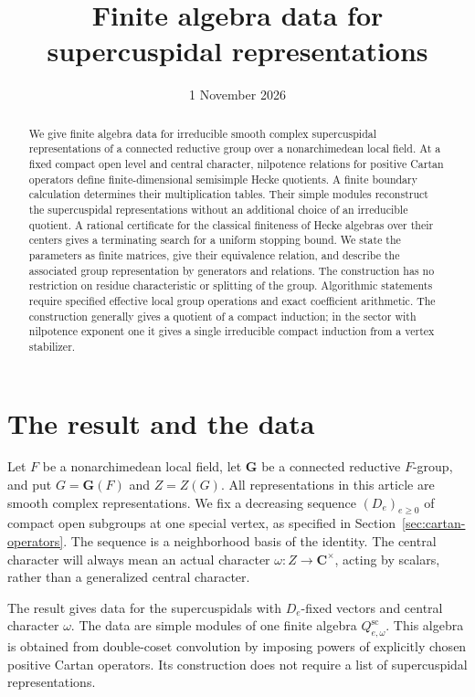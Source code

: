\documentclass[10pt,letterpaper]{amsart}
\title{Finite algebra data for supercuspidal representations}
\date{1 November 2026}
\numberwithin{equation}{section}
\theoremstyle{remark}
\newcommand{\C}{\mathbf C}
\begin{document}
\raggedbottom
\begin{abstract}
We give finite algebra data for irreducible smooth complex supercuspidal
representations of a connected reductive group over a nonarchimedean local field.
At a fixed compact open level and central character, nilpotence relations for
positive Cartan operators define finite-dimensional semisimple Hecke quotients.
A finite boundary calculation determines their multiplication tables. Their simple
modules reconstruct the supercuspidal representations without an additional choice
of an irreducible quotient. A rational certificate for the classical finiteness of
Hecke algebras over their centers gives a terminating search for a uniform stopping
bound. We state the parameters as finite matrices, give their equivalence relation,
and describe the associated group representation by generators and relations.
The construction has no restriction on residue characteristic or splitting of the
group. Algorithmic statements require specified effective local group operations and
exact coefficient arithmetic. The construction generally gives a quotient of a
compact induction; in the sector with nilpotence exponent one it gives a single
irreducible compact induction from a vertex stabilizer.
\end{abstract}
\maketitle
\tableofcontents

\section{The result and the data}
\label{sec:introduction}

Let $F$ be a nonarchimedean local field, let $\mathbf G$ be a connected reductive
$F$-group, and put $G=\mathbf G(F)$ and $Z=Z(G)$. All representations in this
article are smooth complex representations. We fix a decreasing sequence
$(D_e)_{e\ge0}$ of compact open subgroups at one special vertex, as specified
in Section~\ref{sec:cartan-operators}. The sequence is a neighborhood basis
of the identity. The central character will always mean an actual character
$\omega:Z\to\C^\times$, acting by scalars, rather than a generalized central
character.

The result gives data for the supercuspidals with $D_e$-fixed vectors and
central character $\omega$. The data are simple modules of one finite algebra
$Q^{\mathrm{sc}}_{e,\omega}$. This algebra is obtained from double-coset
convolution by imposing powers of explicitly chosen positive Cartan operators.
Its construction does not require a list of supercuspidal representations.
\end{document}
